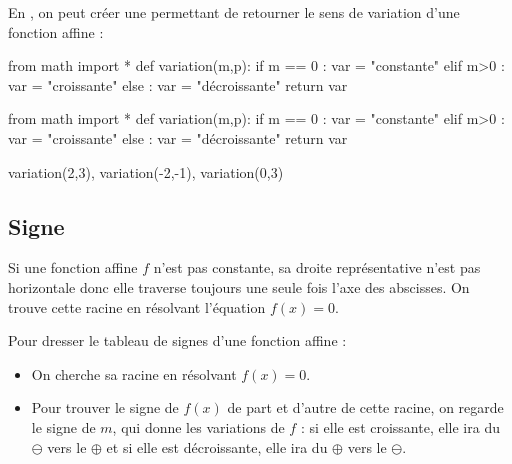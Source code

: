 \documentclass[a4paper,11pt]{article}
\begin{document}
\begin{calgo}
En \calgpython, on peut créer une  permettant de retourner le sens de variation d'une fonction affine :

\begin{tcpythoncode}[15cm]
	\begin{pyverbatim}[][fontsize=\footnotesize,numbers=left,numbersep=10pt]
		from math import *
		def variation(m,p):
			if m == 0 :
				var = "constante"
			elif m>0 :
				var = "croissante"
			else :
				var = "décroissante"
			return var
	\end{pyverbatim}
\end{tcpythoncode}

\begin{pyconcode}
from math import *
def variation(m,p):
	if m == 0 :
		var = "constante"
	elif m>0 :
		var = "croissante"
	else :
		var = "décroissante"
	return var
	
	
\end{pyconcode}

\begin{consolepython}[15cm]
\begin{pyconsole}[][framesep=3mm,frame=single,label={[\scriptsize Début de la console \logopython]\scriptsize Fin de la console \logopython},fontsize=\footnotesize,framerule=1pt,rulecolor=\color{ForestGreen}]
variation(2,3), variation(-2,-1), variation(0,3)
\end{pyconsole}
\end{consolepython}
\end{calgo}

\subsection{Signe}

\begin{cprop}
Si une fonction affine $f$ n'est pas constante, sa droite représentative n'est pas horizontale donc elle traverse toujours une seule fois l'axe des abscisses. On trouve cette racine en résolvant l'équation $f(x)=0$.
\end{cprop}

\begin{cmethode}
Pour dresser le tableau de signes d'une fonction affine :
	\begin{itemize}[leftmargin=*]
		\item On cherche sa racine en résolvant $f(x)=0$.
		\item  Pour trouver le signe de $f(x)$ de part et d'autre de cette racine, on regarde  le signe de $m$, qui donne les variations de $f$ : si elle est croissante, elle ira du $\ominus$ vers le $\oplus$ et si elle est décroissante, elle ira du $\oplus$ vers le $\ominus$.
	\end{itemize}
\end{cmethode}
\end{document}
